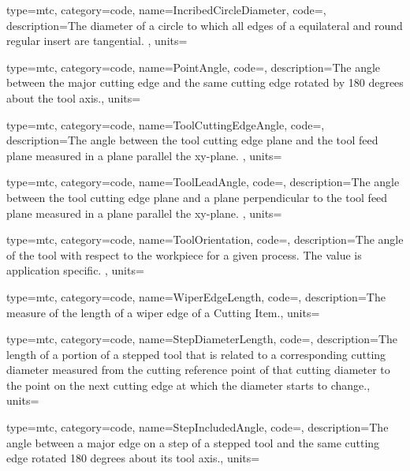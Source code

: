 {
  type=mtc,
  category=code,
  name={IncribedCircleDiameter},
  code=,
  description={The diameter of a circle to which all edges of a equilateral and round regular insert are tangential. },
  units=
}


{
  type=mtc,
  category=code,
  name={PointAngle},
  code=,
  description={The angle between the major cutting edge and the same cutting edge rotated by 180 degrees about the tool axis.},
  units=
}


{
  type=mtc,
  category=code,
  name={ToolCuttingEdgeAngle},
  code=,
  description={The angle between the tool cutting edge plane and the tool feed plane measured in a plane parallel the xy-plane. },
  units=
}


{
  type=mtc,
  category=code,
  name={ToolLeadAngle},
  code=,
  description={The angle between the tool cutting edge plane and a plane perpendicular to the tool feed plane measured in a plane parallel the xy-plane. },
  units=
}


{
  type=mtc,
  category=code,
  name={ToolOrientation},
  code=,
  description={The angle of the tool with respect to the workpiece for a given process. The value is application specific. },
  units=
}


{
  type=mtc,
  category=code,
  name={WiperEdgeLength},
  code=,
  description={The measure of the length of a wiper edge of a Cutting Item.},
  units=
}


{
  type=mtc,
  category=code,
  name={StepDiameterLength},
  code=,
  description={The length of a portion of a stepped tool that is related to a corresponding cutting diameter measured from the cutting reference point of that cutting diameter to the point on the next cutting edge at which the diameter starts to change.},
  units=
}


{
  type=mtc,
  category=code,
  name={StepIncludedAngle},
  code=,
  description={The angle between a major edge on a step of a stepped tool and the same cutting edge rotated 180 degrees about its tool axis.},
  units=
}


